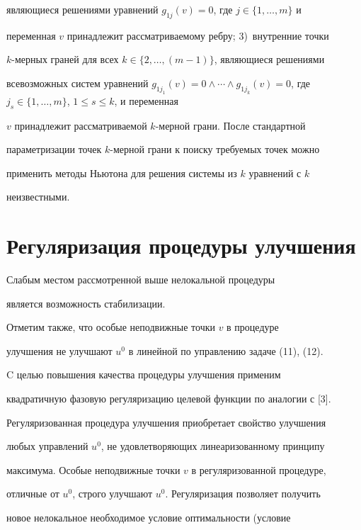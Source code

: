являющиеся решениями уравнений $g_{1j}(v)=0$, где $j\in\{1,\dotsc,m\}$ и 


переменная $v$ принадлежит рассматриваемому ребру; 3)~внутренние точки 


$k$-мерных граней для всех $k\in\{2,\dotsc,(m-1)\}$, являющиеся решениями 


всевозможных систем уравнений $g_{1j_1}(v)=0\wedge\dotsb\wedge 


g_{1j_k}(v)=0$, где $j_s\in\{1,\dotsc,m\}$, $1\le s\le k$, и переменная 


$v$ принадлежит рассматриваемой $k$-мерной грани. После стандартной 


параметризации точек $k$-мерной грани к поиску требуемых точек можно 


применить методы Ньютона для решения системы из $k$ уравнений с $k$ 


неизвестными. 


 


\section{Регуляризация процедуры улучшения} 


 


Слабым местом рассмотренной выше нелокальной процедуры 


является возможность стабилизации. 


Отметим также, что особые неподвижные точки $v$ в процедуре 


улучшения не улучшают $u^0$ в линейной по управлению задаче (11), (12). 


 


C целью повышения качества процедуры улучшения применим 


квадратичную фазовую регуляризацию целевой функции по аналогии с [3]. 


Регуляризованная процедура улучшения приобретает свойство улучшения 


любых управлений $u^0$, не удовлетворяющих линеаризованному принципу 


максимума. Особые неподвижные точки $v$ в регуляризованной процедуре, 


отличные от $u^0$, строго улучшают $u^0$. Регуляризация позволяет получить 


новое нелокальное необходимое условие оптимальности (условие 



